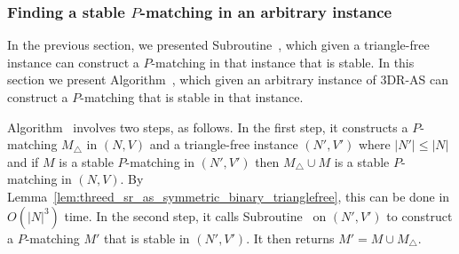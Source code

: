\subsubsection{Finding a stable \texorpdfstring{$P$}{P}-matching in an arbitrary instance}
\label{sec:threed_sr_as_symmetric_binary_finding_in_general}

In the previous section, we presented Subroutine~, which given a triangle-free instance can construct a $P$\nobreakdash-matching in that instance that is stable. In this section we present Algorithm~, which given an arbitrary instance of 3DR-AS can construct a $P$\nobreakdash-matching that is stable in that instance.

Algorithm~ involves two steps, as follows. In the first step, it constructs a $P$\nobreakdash-matching $M_{\triangle}$ in $(N, V)$ and a triangle-free instance $(N', V')$ where $|N'| \leq |N|$ and if $M$ is a stable $P$\nobreakdash-matching in $(N', V')$ then $M_{\triangle} \cup M$ is a stable $P$\nobreakdash-matching in $(N, V)$. By Lemma~\ref{lem:threed_sr_as_symmetric_binary_trianglefree}, this can be done in $O(|N|^3)$ time. In the second step, it calls Subroutine~ on $(N', V')$ to construct a $P$\nobreakdash-matching $M'$ that is stable in $(N', V')$. It then returns $M' = M \cup M_{\triangle}$.



